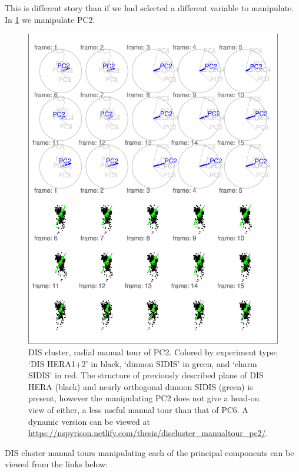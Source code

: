 \documentclass{monashthesis}
\begin{document}
This is different story than if we had selected a different variable to manipulate. In \ref{fig:DISclusterBad} we manipulate PC2.

\begin{figure}
\centering
\includegraphics{thesis_files/figure-latex/DISclusterBad-1.pdf}
\caption{\label{fig:DISclusterBad}DIS cluster, radial manual tour of PC2. Colored by experiment type: `DIS HERA1+2' in black, `dimuon SIDIS' in green, and `charm SIDIS' in red. The structure of previously described plane of DIS HERA (black) and nearly orthogonal dimuon SIDIS (green) is present, however the manipulating PC2 does not give a head-on view of either, a less useful manual tour than that of PC6. A dynamic version can be viewed at \url{https://nspyrison.netlify.com/thesis/discluster_manualtour_pc2/}.}
\end{figure}

DIS cluster manual tours manipulating each of the principal components can be viewed from the links below:
\end{document}
